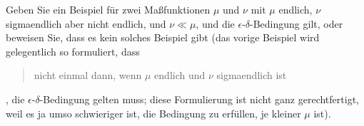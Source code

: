 
\begin{exercise}

Geben Sie ein Beispiel für zwei Maßfunktionen $\mu$ und $\nu$ mit $\mu$ endlich, $\nu$ sigmaendlich aber nicht endlich, und $\nu \ll \mu$, und die $\epsilon$-$\delta$-Bedingung gilt, oder beweisen Sie, dass es kein solches Beispiel gibt (das vorige Beispiel wird gelegentlich so formuliert, dass \blockquote{nicht einmal dann, wenn $\mu$ endlich und $\nu$ sigmaendlich ist}, die $\epsilon$-$\delta$-Bedingung gelten muss; diese Formulierung ist nicht ganz gerechtfertigt, weil es ja umso schwieriger ist, die Bedingung zu erfüllen, je kleiner $\mu$ ist).

\end{exercise}


